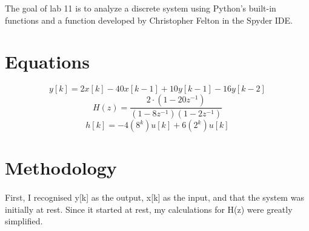 \documentclass[12pt]{report}
\begin{document}
The goal of lab 11 is to analyze a discrete system using Python's built-in functions and a function developed by Christopher Felton in the Spyder IDE.

\section{Equations}
    \begin{equation}
        y[k] = 2x[k] - 40x[k-1] + 10y[k-1] - 16y[k-2] 
    \end{equation}
    \begin{equation}
        H(z) = \frac{2 \cdot (1-20z^{-1})}{(1-8z^{-1})(1-2z^{-1})}
    \end{equation}
    \begin{equation}
         h[k] = -4(8^k)u[k] + 6(2^k)u[k]
    \end{equation}
    
\section{Methodology}


    \paragraph{} First, I recognised y[k] as the output, x[k] as the input, and that the system was initially at rest. Since it started at rest, my calculations for H(z) were greatly simplified.  
    
\end{document}
